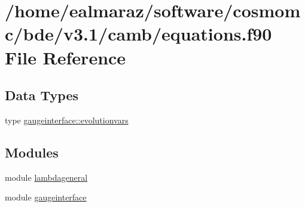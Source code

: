 \hypertarget{equations_8f90}{}\section{/home/ealmaraz/software/cosmomc/bde/v3.1/camb/equations.f90 File Reference}
\label{equations_8f90}
\subsection*{Data Types}
\begin{DoxyCompactItemize}
\item 
type \mbox{\hyperlink{structgaugeinterface_1_1evolutionvars}{gaugeinterface\+::evolutionvars}}
\end{DoxyCompactItemize}
\subsection*{Modules}
\begin{DoxyCompactItemize}
\item 
module \mbox{\hyperlink{namespacelambdageneral}{lambdageneral}}
\item 
module \mbox{\hyperlink{namespacegaugeinterface}{gaugeinterface}}
\end{DoxyCompactItemize}
